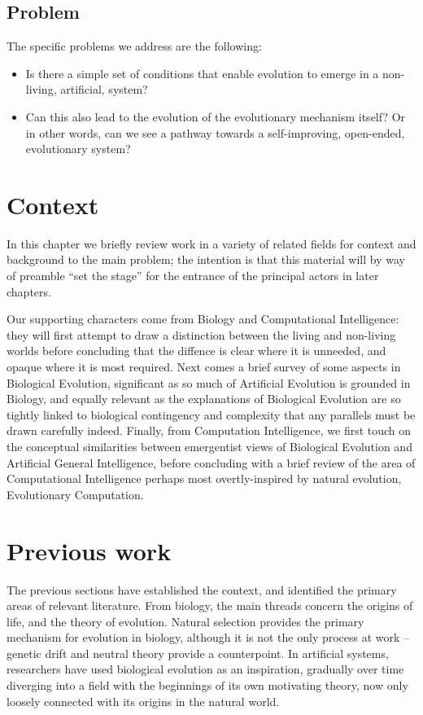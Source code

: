 \documentclass[]{report}
\begin{document}
\section{Problem}
The specific problems we address are the following:
\begin{itemize}
	\item Is there a simple set of conditions that enable evolution to emerge in a non-living, artificial, system?
	\item Can this also lead to the evolution of the evolutionary mechanism itself? Or in other words, can we see a pathway towards a self-improving, open-ended, evolutionary system?
\end{itemize}

\chapter{Context}
In this chapter we briefly review work in a variety of related fields for context and background to the main problem; the intention is that this material will by way of preamble ``set the stage'' for the entrance of the principal actors in later chapters.

Our supporting characters come from Biology and Computational Intelligence: they will first attempt to draw a distinction between the living and non-living worlds before concluding that the diffence is clear where it is unneeded, and opaque where it is most required. Next comes a brief survey of some aspects in Biological Evolution, significant as so much of Artificial Evolution is grounded in Biology, and equally relevant as the explanations of Biological Evolution are so tightly linked to biological contingency and complexity that any parallels must be drawn carefully indeed. Finally, from Computation Intelligence, we first touch on the conceptual similarities between emergentist views of Biological Evolution and Artificial General Intelligence, before concluding with a brief review of the area of Computational Intelligence perhaps most overtly-inspired by natural evolution, Evolutionary Computation.

\chapter{Previous work}
The previous sections have established the context, and identified the primary areas of relevant literature. From biology, the main threads concern the origins of life, and the theory of evolution. Natural selection provides the primary mechanism for evolution in biology, although it is not the only process at work -- genetic drift and neutral theory provide a counterpoint. In artificial systems, researchers have used biological evolution as an inspiration, gradually over time diverging into a field with the beginnings of its own motivating theory, now only loosely connected with its origins in the natural world.
\end{document}
